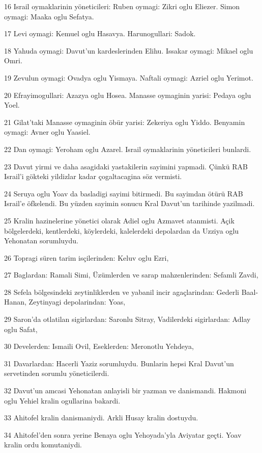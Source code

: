 \par 16 Israil oymaklarinin yöneticileri: Ruben oymagi: Zikri oglu Eliezer. Simon oymagi: Maaka oglu Sefatya.
\par 17 Levi oymagi: Kemuel oglu Hasavya. Harunogullari: Sadok.
\par 18 Yahuda oymagi: Davut'un kardeslerinden Elihu. Issakar oymagi: Mikael oglu Omri.
\par 19 Zevulun oymagi: Ovadya oglu Yismaya. Naftali oymagi: Azriel oglu Yerimot.
\par 20 Efrayimogullari: Azazya oglu Hosea. Manasse oymaginin yarisi: Pedaya oglu Yoel.
\par 21 Gilat'taki Manasse oymaginin öbür yarisi: Zekeriya oglu Yiddo. Benyamin oymagi: Avner oglu Yaasiel.
\par 22 Dan oymagi: Yeroham oglu Azarel. Israil oymaklarinin yöneticileri bunlardi.
\par 23 Davut yirmi ve daha asagidaki yastakilerin sayimini yapmadi. Çünkü RAB Israil'i gökteki yildizlar kadar çogaltacagina söz vermisti.
\par 24 Seruya oglu Yoav da basladigi sayimi bitirmedi. Bu sayimdan ötürü RAB Israil'e öfkelendi. Bu yüzden sayimin sonucu Kral Davut'un tarihinde yazilmadi.
\par 25 Kralin hazinelerine yönetici olarak Adiel oglu Azmavet atanmisti. Açik bölgelerdeki, kentlerdeki, köylerdeki, kalelerdeki depolardan da Uzziya oglu Yehonatan sorumluydu.
\par 26 Topragi süren tarim isçilerinden: Keluv oglu Ezri,
\par 27 Baglardan: Ramali Simi, Üzümlerden ve sarap mahzenlerinden: Sefamli Zavdi,
\par 28 Sefela bölgesindeki zeytinliklerden ve yabanil incir agaçlarindan: Gederli Baal-Hanan, Zeytinyagi depolarindan: Yoas,
\par 29 Saron'da otlatilan sigirlardan: Saronlu Sitray, Vadilerdeki sigirlardan: Adlay oglu Safat,
\par 30 Develerden: Ismaili Ovil, Eseklerden: Meronotlu Yehdeya,
\par 31 Davarlardan: Hacerli Yaziz sorumluydu. Bunlarin hepsi Kral Davut'un servetinden sorumlu yöneticilerdi.
\par 32 Davut'un amcasi Yehonatan anlayisli bir yazman ve danismandi. Hakmoni oglu Yehiel kralin ogullarina bakardi.
\par 33 Ahitofel kralin danismaniydi. Arkli Husay kralin dostuydu.
\par 34 Ahitofel'den sonra yerine Benaya oglu Yehoyada'yla Aviyatar geçti. Yoav kralin ordu komutaniydi.

